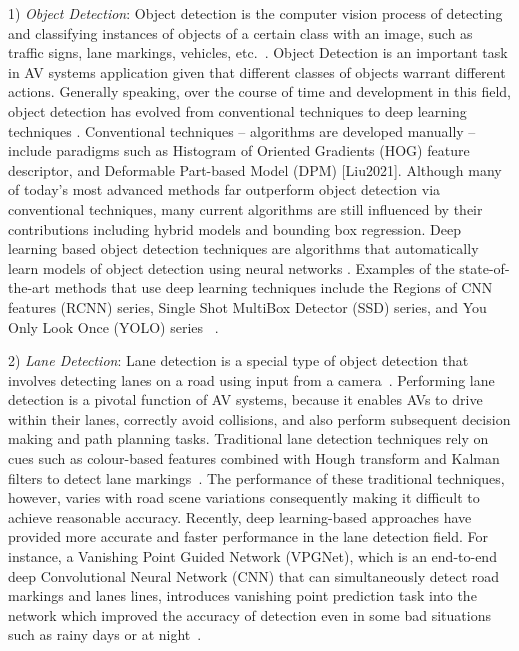 \documentclass{article}
\begin{document}
1) \emph{Object Detection}: Object detection is the computer vision process of detecting and classifying instances of objects of a certain class with an image, such as traffic signs, lane markings, vehicles, etc.~\cite{Liu2021}. Object Detection is an important task in AV systems application given that different classes of objects warrant different actions. Generally speaking, over the course of time and development in this field, object detection has evolved from conventional techniques to deep learning techniques . Conventional techniques -- algorithms are developed manually -- include paradigms such as Histogram of Oriented Gradients (HOG) feature descriptor, and Deformable Part-based Model (DPM)  [Liu2021]. Although many of today’s most advanced methods far outperform object detection via conventional techniques, many current algorithms are still influenced by their contributions including hybrid models and bounding box regression. Deep learning based object detection techniques are algorithms that automatically learn models of object detection using neural networks . Examples of the state-of-the-art methods that use deep learning techniques include the Regions of CNN features (RCNN) series, Single Shot MultiBox Detector (SSD) series, and You Only Look Once (YOLO) series ~\cite{Liu2021}. 

2) \emph{Lane Detection}: Lane detection is a special type of object detection that involves detecting lanes on a road using input from a camera~\cite{Liu2021}. Performing lane detection is a pivotal function of AV systems, because it enables AVs to drive within their lanes, correctly avoid collisions, and also perform subsequent decision making and path planning tasks. Traditional lane detection techniques rely on cues such as colour-based features combined with Hough transform and Kalman filters to detect lane markings~\cite{Liu2021}. The performance of these traditional techniques, however, varies with road scene variations consequently making it difficult to achieve reasonable accuracy. Recently, deep learning-based approaches have provided more accurate and faster performance in the lane detection field. For instance, a Vanishing Point Guided Network (VPGNet), which is an end-to-end deep Convolutional Neural Network (CNN) that can simultaneously detect road markings and lanes lines, introduces vanishing point prediction task into the network which improved the accuracy of detection even in some bad situations such as rainy days or at night~\cite{Lee2017}.
\end{document}
